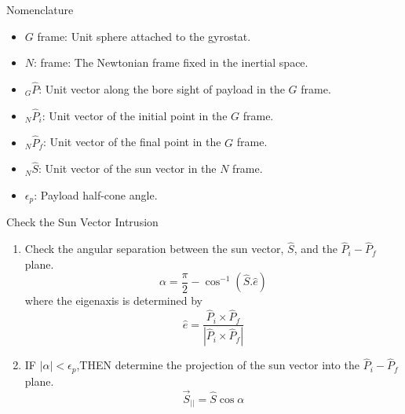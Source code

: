 \documentclass{beamer}
\begin{document}
\begin{frame}
\begin{block}{Nomenclature}
\begin{itemize}
\item $G$ frame: Unit sphere attached to the gyrostat.
\item $N$: frame: The Newtonian frame fixed in the inertial space.
\item $_G\hat{P}$: Unit vector along the bore sight of payload in the $G$ frame.
\item $_N\hat{P}_i$: Unit vector of the initial point in the $G$ frame.
\item $_N\hat{P}_f$: Unit vector of the final point in the $G$ frame.
\item $_N\hat{S}$: Unit vector of the sun vector in the $N$ frame.
 \item $\epsilon_p$: Payload half-cone angle.
\end{itemize}
\end{block}
\end{frame}

\begin{frame}
\begin{block}{Check the Sun Vector Intrusion}
\begin{enumerate}
\item Check the angular separation between the sun vector, $\hat{S}$, and the $\hat{P}_i-\hat{P}_f$ plane.
\begin{equation}
\alpha=\frac{\pi}{2}-\cos^{-1}(\hat{S}.\hat{e})
\end{equation}
where the eigenaxis is determined by
\begin{equation}\label{eaxis}
\hat{e}=\frac{\hat{P}_i\times\hat{P}_f}{|\hat{P}_i\times \hat{P}_f|}
\end{equation} 

\item IF $|\alpha|<\epsilon_p$,THEN determine the projection of the sun vector into the $\hat{P}_i-\hat{P}_f$ plane.
\begin{equation}\label{Sbar}
\vec{S}_{||}=\hat{S}\cos\alpha
\end{equation}

\end{enumerate}
\end{block}
\end{frame}
\end{document}
